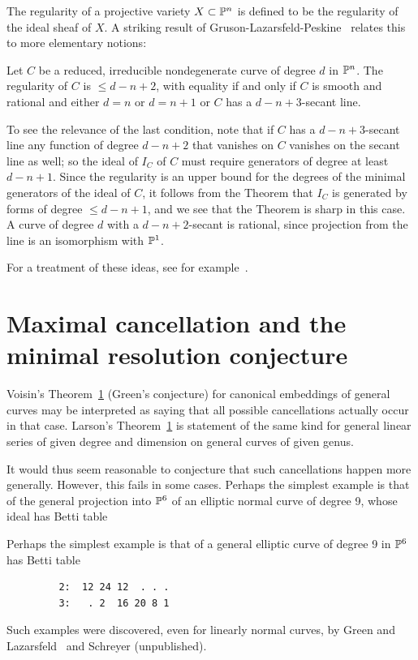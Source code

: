 The regularity of a projective variety $X\subset {\mathbb P}^{n}$ is  defined to be the regularity of the ideal sheaf of $X$. A striking result of Gruson-Lazarsfeld-Peskine~\cite{***} relates this to more elementary notions:

\begin{theorem}\label{GLP}
 Let $C$ be a reduced, irreducible nondegenerate curve of degree $d$ in ${\mathbb P}^{n}$. The regularity of $C$ is $\leq d-n+2$, with equality if and only if $C$ is smooth and rational and either $d=n$ or $d=n+1$ or $C$ has a $d-n+3$-secant line. 
 \end{theorem}
 
To see the relevance of the last condition, note that if $C$ has a $d-n+3$-secant line any function
of degree $d-n+2$ that vanishes on $C$ vanishes on the secant line as well; so the ideal of $I_{C}$ of $C$
must require generators of degree at least $d-n+1$. Since the regularity is an upper bound for the degrees of the minimal generators of the ideal of $C$, it follows from the Theorem that $I_{C}$ is generated by
forms of degree $\leq d-n+1$, and we see that the Theorem is sharp in this case. A curve
of degree $d$ with a $d-n+2$-secant is rational, since projection from the line is an isomorphism with ${\mathbb P}^{1}$.

For a  treatment of these ideas, see for example~\cite{geomsyz}.

\section{Maximal cancellation and the minimal resolution conjecture}
Voisin's Theorem~\ref{} (Green's conjecture) for canonical embeddings of general curves may be interpreted
as saying that all possible cancellations actually occur in that case. Larson's Theorem~\ref{}
 is  statement of the same kind for general linear series of
given degree and dimension on general curves of given genus. 

It would thus seem reasonable to conjecture that such cancellations happen more generally. However, this fails in some cases. Perhaps the simplest example is that of the general projection into ${\mathbb P}^{6}$ of
an elliptic normal curve of degree 9, whose ideal has Betti table

Perhaps the simplest example is that of a general elliptic curve of degree 9 in ${\mathbb P}^{6}$
has Betti table
\begin{verbatim}
         2:  12 24 12  . . .
         3:   . 2  16 20 8 1
\end{verbatim}
Such examples were discovered, even for linearly normal curves, by Green and Lazarsfeld~\cite{Green-Lazarsfeld1} and Schreyer (unpublished). 

